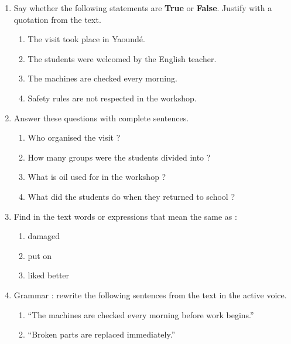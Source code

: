 \documentclass[11pt]{article}
\begin{document}
\begin{exercice}
\begin{enumerate}
\item Say whether the following statements are \textbf{True} or \textbf{False}. Justify with a quotation from the text.
\begin{enumerate}
\item The visit took place in Yaoundé.
\item The students were welcomed by the English teacher.
\item The machines are checked every morning.
\item Safety rules are not respected in the workshop.
\end{enumerate}
\item Answer these questions with complete sentences.
\begin{enumerate}
\item Who organised the visit ?
\item How many groups were the students divided into ?
\item What is oil used for in the workshop ?
\item What did the students do when they returned to school ?
\end{enumerate}
\item Find in the text words or expressions that mean the same as :
\begin{enumerate}
\item damaged
\item put on
\item liked better
\end{enumerate}
\item Grammar : rewrite the following sentences from the text in the active voice.
\begin{enumerate}
\item ``The machines are checked every morning before work begins.''
\item ``Broken parts are replaced immediately.''
\end{enumerate}
\end{enumerate}
\end{exercice}
\end{document}
